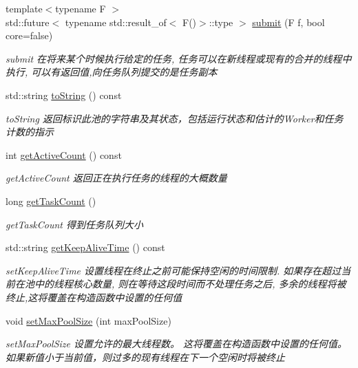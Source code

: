 \begin{DoxyCompactItemize}
{\footnotesize template$<$typename F $>$ }\\std\+::future$<$ typename std\+::result\+\_\+of$<$ F()$>$\+::type $>$ \hyperlink{classThreadPoolExecutor_aaaef92fe45f7f5a8b659187c15881ca3}{submit} (F f, bool core=false)
\begin{DoxyCompactList}\small\item\em submit 在将来某个时候执行给定的任务, 任务可以在新线程或现有的合并的线程中执行, 可以有返回值,向任务队列提交的是任务副本 \end{DoxyCompactList}\item 
std\+::string \hyperlink{classThreadPoolExecutor_af85a124c9169a546bfbd725725024527}{to\+String} () const
\begin{DoxyCompactList}\small\item\em to\+String 返回标识此池的字符串及其状态，包括运行状态和估计的\+Worker和任务计数的指示 \end{DoxyCompactList}\item 
int \hyperlink{classThreadPoolExecutor_a1a4a5262dc8db7933c27dbbc267d4825}{get\+Active\+Count} () const
\begin{DoxyCompactList}\small\item\em get\+Active\+Count 返回正在执行任务的线程的大概数量 \end{DoxyCompactList}\item 
long \hyperlink{classThreadPoolExecutor_a50b63440d1d93f3c5c19082ca538edb6}{get\+Task\+Count} ()
\begin{DoxyCompactList}\small\item\em get\+Task\+Count 得到任务队列大小 \end{DoxyCompactList}\item 
std\+::string \hyperlink{classThreadPoolExecutor_aeb35f2475788af6b98d1ca1bf8d05536}{get\+Keep\+Alive\+Time} () const
\begin{DoxyCompactList}\small\item\em set\+Keep\+Alive\+Time 设置线程在终止之前可能保持空闲的时间限制. 如果存在超过当前在池中的线程核心数量, 则在等待这段时间而不处理任务之后, 多余的线程将被终止,这将覆盖在构造函数中设置的任何值 \end{DoxyCompactList}\item 
void \hyperlink{classThreadPoolExecutor_a83e9e3715fdacc5b2f08b563d39bb62b}{set\+Max\+Pool\+Size} (int max\+Pool\+Size)
\begin{DoxyCompactList}\small\item\em set\+Max\+Pool\+Size 设置允许的最大线程数。 这将覆盖在构造函数中设置的任何值。 如果新值小于当前值，则过多的现有线程在下一个空闲时将被终止 \end{DoxyCompactList}\item 

\end{DoxyCompactItemize}

